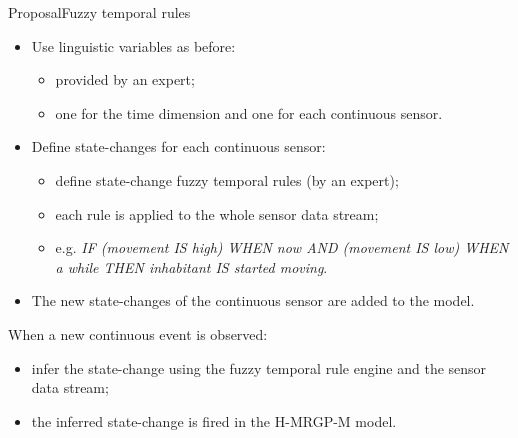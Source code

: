 \documentclass[9pt, handout]{beamer}
\begin{document}
      \begin{frame}{Proposal}{Fuzzy temporal rules}
        \pause
        \begin{itemize}
          \item Use linguistic variables as before:
          \begin{itemize}
            \item provided by an expert;
            \item one for the time dimension and one for each continuous sensor.
          \end{itemize}
          \pause
          \item Define state-changes for each continuous sensor:
          \begin{itemize}
            \item define state-change fuzzy temporal rules (by an expert);
            \item each rule is applied to the whole sensor data stream;
            \item e.g. \textit{IF (movement IS high) WHEN now AND (movement IS low) WHEN a while THEN inhabitant IS started moving}.
          \end{itemize}
          \pause
          \item The new state-changes of the continuous sensor are added to the model.
        \end{itemize}
        \pause
        When a new continuous event is observed:
        \pause
        \begin{itemize}
          \item infer the state-change using the fuzzy temporal rule engine and the sensor data stream;
          \pause
          \item the inferred state-change is fired in the H-MRGP-M model.
        \end{itemize}
      \end{frame}
      
\end{document}
